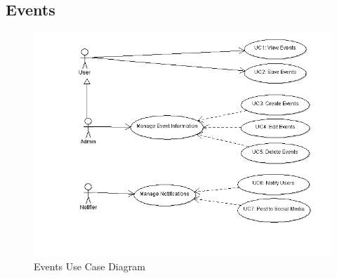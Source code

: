 \documentclass[11pt]{article}
\begin{document}
	\subsection{Events}
	\begin{figure}[!h]
        \centering
        \includegraphics[width=\textwidth]{Diagrams/Events/EventsUseCaseDiagram_Final}
        \caption{Events Use Case Diagram}
        \label{fig:events_use_case}
    \end{figure}
   
\end{document}
